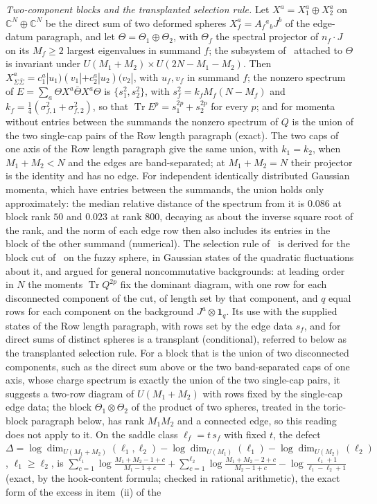 \emph{Two-component blocks and the transplanted selection rule.} Let \(X^a=X^a_1\oplus X^a_2\) on \(\mathbb C^N\oplus\mathbb C^N\) be the direct sum of two deformed spheres \(X^a_f=A_f{}^a{}_bJ^b\) of the edge-datum paragraph, and let \(\Theta=\Theta_1\oplus\Theta_2\), with \(\Theta_f\) the spectral projector of \(n_f\cdot J\) on its \(M_f\ge2\) largest eigenvalues in summand \(f\); the subsystem of~\cite{FlissFrenkelHartnollSoni2025} attached to \(\Theta\) is invariant under \(U(M_1+M_2)\times U(2N-M_1-M_2)\). Then \(X^a_{\Sigma\bar\Sigma}=c^a_1|u_1)(v_1|+c^a_2|u_2)(v_2|\), with \(u_f,v_f\) in summand \(f\); the nonzero spectrum of \(E=\sum_a\Theta X^a\bar\Theta X^a\Theta\) is \(\{s_1^2,s_2^2\}\), with \(s_f^2=k_fM_f(N-M_f)\) and \(k_f=\tfrac14(\sigma_{f,1}^2+\sigma_{f,2}^2)\), so that \(\operatorname{Tr}E^p=s_1^{2p}+s_2^{2p}\) for every \(p\); and for momenta without entries between the summands the nonzero spectrum of \(Q\) is the union of the two single-cap pairs of the Row length paragraph (exact). The two caps of one axis of the Row length paragraph give the same union, with \(k_1=k_2\), when \(M_1+M_2<N\) and the edges are band-separated; at \(M_1+M_2=N\) their projector is the identity and has no edge. For independent identically distributed Gaussian momenta, which have entries between the summands, the union holds only approximately: the median relative distance of the spectrum from it is \(0.086\) at block rank \(50\) and \(0.023\) at rank \(800\), decaying as about the inverse square root of the rank, and the norm of each edge row then also includes its entries in the block of the other summand (numerical). The selection rule of~\cite{Frenkel2023EdgeModes} is derived for the block cut of~\cite{FlissFrenkelHartnollSoni2025} on the fuzzy sphere, in Gaussian states of the quadratic fluctuations about it, and argued for general noncommutative backgrounds: at leading order in \(N\) the moments \(\operatorname{Tr}Q^{2p}\) fix the dominant diagram, with one row for each disconnected component of the cut, of length set by that component, and \(q\) equal rows for each component on the background \(J^a\otimes\mathbf 1_q\). Its use with the supplied states of the Row length paragraph, with rows set by the edge data \(s_f\), and for direct sums of distinct spheres is a transplant (conditional), referred to below as the transplanted selection rule. For a block that is the union of two disconnected components, such as the direct sum above or the two band-separated caps of one axis, whose charge spectrum is exactly the union of the two single-cap pairs, it suggests a two-row diagram of \(U(M_1+M_2)\) with rows fixed by the single-cap edge data; the block \(\Theta_1\otimes\Theta_2\) of the product of two spheres, treated in the toric-block paragraph below, has rank \(M_1M_2\) and a connected edge, so this reading does not apply to it. On the saddle class \(\ell_f=t\,s_f\) with fixed \(t\), the defect \(\Delta=\log\dim_{U(M_1+M_2)}(\ell_1,\ell_2)-\log\dim_{U(M_1)}(\ell_1)-\log\dim_{U(M_2)}(\ell_2)\), \(\ell_1\ge\ell_2\), is \(\sum_{c=1}^{\ell_1}\log\frac{M_1+M_2-1+c}{M_1-1+c}+\sum_{c=1}^{\ell_2}\log\frac{M_1+M_2-2+c}{M_2-1+c}-\log\frac{\ell_1+1}{\ell_1-\ell_2+1}\) (exact, by the hook-content formula; checked in rational arithmetic), the exact form of the excess in item~(ii) of the 